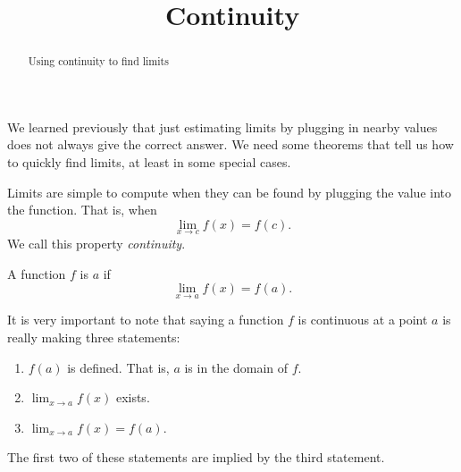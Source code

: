 \documentclass{ximera}
\title[Dig-In:]{Continuity}
\begin{document}
\begin{abstract}
Using continuity to find limits
\end{abstract}
\maketitle


We learned previously that just estimating limits by plugging in nearby values
does not always give the correct answer.  We need some theorems that
tell us how to quickly find limits, at least in some special cases.  

Limits are simple to compute when they can be found by plugging the
value into the function.  That is, when
\[
\lim_{x\to c}f(x) = f(c).
\]
We call this property \textit{continuity}.

\begin{definition}
  A function $f$ is  $a$ if
  \[
  \lim_{x\to a}f(x) = f(a).
  \]
\end{definition}


It is very important to note that saying a function $f$ is continuous
at a point $a$ is really making three statements:
\begin{enumerate}
\item $f(a)$ is defined.  That is, $a$ is in the domain of $f$.
\item $\lim_{x\to a}f(x)$ exists.
\item $\lim_{x\to a} f(x) = f(a)$.
\end{enumerate}

The first two of these statements are implied by the third statement.
\end{document}
